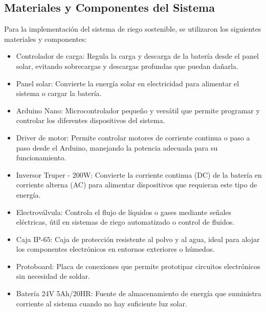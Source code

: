 \documentclass[12pt]{article}
\begin{document}

\subsection*{Materiales y Componentes del Sistema}
Para la implementación del sistema de riego sostenible, se utilizaron los siguientes materiales y componentes:
\begin{itemize}
      \item Controlador de carga: Regula la carga y descarga de la batería desde el panel solar, evitando sobrecargas y descargas profundas que puedan dañarla.
      \item Panel solar: Convierte la energía solar en electricidad para alimentar el sistema o cargar la batería.
      \item Arduino Nano: Microcontrolador pequeño y versátil que permite programar y controlar los diferentes dispositivos del sistema.
      \item Driver de motor: Permite controlar motores de corriente continua o paso a paso desde el Arduino, manejando la potencia adecuada para su funcionamiento.
      \item Inversor Truper - 200W: Convierte la corriente continua (DC) de la batería en corriente alterna (AC) para alimentar dispositivos que requieran este tipo de energía.
      \item Electroválvula: Controla el flujo de líquidos o gases mediante señales eléctricas, útil en sistemas de riego automatizado o control de fluidos.
      \item Caja IP-65: Caja de protección resistente al polvo y al agua, ideal para alojar los componentes electrónicos en entornos exteriores o húmedos.
      \item Protoboard: Placa de conexiones que permite prototipar circuitos electrónicos sin necesidad de soldar.
      \item Batería 24V 5Ah/20HR: Fuente de almacenamiento de energía que suministra corriente al sistema cuando no hay suficiente luz solar.
\end{itemize}
\end{document}
